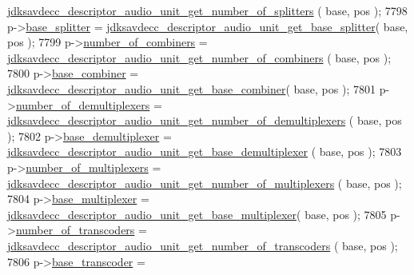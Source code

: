 \begin{DoxyCode}
      \hyperlink{group__descriptor__audio_ga293d054cd8fa6d17da7c35550b65c79e}{jdksavdecc\_descriptor\_audio\_unit\_get\_number\_of\_splitters}
      ( base, pos );
7798         p->\hyperlink{structjdksavdecc__descriptor__audio__unit_a7a10a93a209406b90273d791f69a4421}{base\_splitter} = 
      \hyperlink{group__descriptor__audio_ga4900735a921bd7016439df94304a5970}{jdksavdecc\_descriptor\_audio\_unit\_get\_base\_splitter}( base,
       pos );
7799         p->\hyperlink{structjdksavdecc__descriptor__audio__unit_afbc32f9432e80e58a019b1be2388cf66}{number\_of\_combiners} = 
      \hyperlink{group__descriptor__audio_ga44bb436e208816550d4a090958cd39b9}{jdksavdecc\_descriptor\_audio\_unit\_get\_number\_of\_combiners}
      ( base, pos );
7800         p->\hyperlink{structjdksavdecc__descriptor__audio__unit_afeae9980c36b3e99f2e4b8ab2c31e9d5}{base\_combiner} = 
      \hyperlink{group__descriptor__audio_ga88f5818dbcc20fcf7f64a84300e62006}{jdksavdecc\_descriptor\_audio\_unit\_get\_base\_combiner}( base,
       pos );
7801         p->\hyperlink{structjdksavdecc__descriptor__audio__unit_ae2ee0d16f100be7e14722eaffcc600b4}{number\_of\_demultiplexers} = 
      \hyperlink{group__descriptor__audio_gae1a89741644481a0fa60583f7ec7be4a}{jdksavdecc\_descriptor\_audio\_unit\_get\_number\_of\_demultiplexers}
      ( base, pos );
7802         p->\hyperlink{structjdksavdecc__descriptor__audio__unit_a36901b5833f03ae7be92b52745b3054c}{base\_demultiplexer} = 
      \hyperlink{group__descriptor__audio_gae0c583b986c799ad31387680bfc0a41d}{jdksavdecc\_descriptor\_audio\_unit\_get\_base\_demultiplexer}
      ( base, pos );
7803         p->\hyperlink{structjdksavdecc__descriptor__audio__unit_aa2bffcf80dd2b162cce9a335ef515165}{number\_of\_multiplexers} = 
      \hyperlink{group__descriptor__audio_ga61736bd58ff4caeb688cc4b52c4e178a}{jdksavdecc\_descriptor\_audio\_unit\_get\_number\_of\_multiplexers}
      ( base, pos );
7804         p->\hyperlink{structjdksavdecc__descriptor__audio__unit_a3e13f295f26afe3335587c18790c7dda}{base\_multiplexer} = 
      \hyperlink{group__descriptor__audio_ga2717be054162a54c60af428f076b6845}{jdksavdecc\_descriptor\_audio\_unit\_get\_base\_multiplexer}(
       base, pos );
7805         p->\hyperlink{structjdksavdecc__descriptor__audio__unit_ad9030c572f8891febbc6108f96772835}{number\_of\_transcoders} = 
      \hyperlink{group__descriptor__audio_gaf4f033db7a41cd05cc30c3227d5ee48c}{jdksavdecc\_descriptor\_audio\_unit\_get\_number\_of\_transcoders}
      ( base, pos );
7806         p->\hyperlink{structjdksavdecc__descriptor__audio__unit_ac7e02a98f43dc72d6384a6635fbaf944}{base\_transcoder} = 

\end{DoxyCode}
